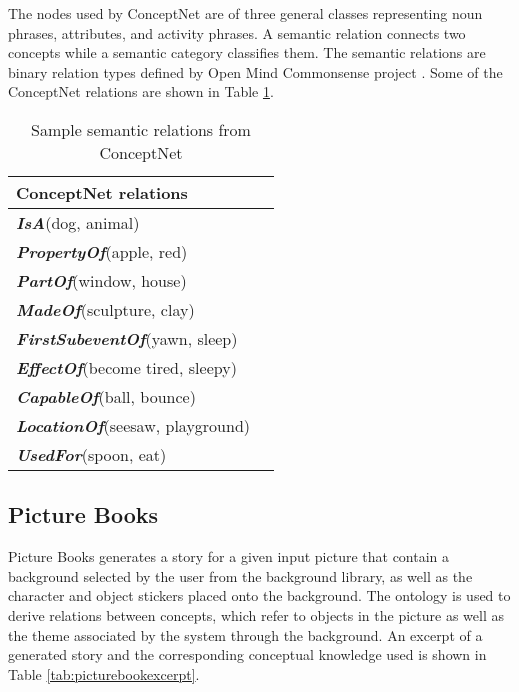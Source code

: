 The nodes used by ConceptNet are of three general classes representing noun phrases, attributes, and activity phrases. A semantic relation connects two concepts while a semantic category classifies them. The semantic relations are binary relation types defined by Open Mind Commonsense project \cite{Singh:2002}. Some of the ConceptNet relations are shown in Table \ref{tab:conceptnetrel}. 

\begin{table}[ht]   %
\centering
\caption{Sample semantic relations from ConceptNet \protect \cite{Liu:2004b}} \vspace{0.25em}
\begin{tabular}{|l|l|} \hline
ConceptNet relations \\ \hline
\textbf{\emph{IsA}}(dog, animal)  \\
\textbf{\emph{PropertyOf}}(apple, red) \\
\textbf{\emph{PartOf}}(window, house) \\ 
\textbf{\emph{MadeOf}}(sculpture, clay) \\
\textbf{\emph{FirstSubeventOf}}(yawn, sleep) \\
\textbf{\emph{EffectOf}}(become tired, sleepy) \\
\textbf{\emph{CapableOf}}(ball, bounce) \\
\textbf{\emph{LocationOf}}(seesaw, playground) \\
\textbf{\emph{UsedFor}}(spoon, eat) \\ \hline
\end{tabular}
\label{tab:conceptnetrel}
\end{table}

\subsection{Picture Books}
\label{sec:picturebooks}

Picture Books generates a story for a given input picture that contain a background selected by the user from the background library, as well as the character and object stickers placed onto the background. The ontology is used to derive relations between concepts, which refer to objects in the picture as well as the theme associated by the system through the background. An excerpt of a generated story and the corresponding conceptual knowledge used is shown in Table \ref{tab:picturebookexcerpt}.


